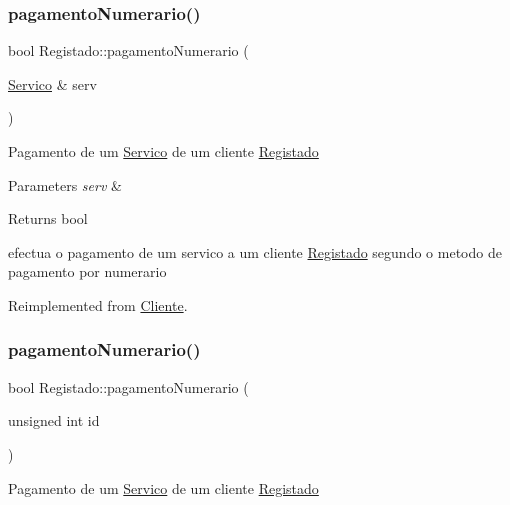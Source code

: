 \subsubsection{\texorpdfstring{pagamento\+Numerario()}{pagamentoNumerario()}\hspace{0.1cm}{\footnotesize\ttfamily [1/2]}}
{\footnotesize\ttfamily bool Registado\+::pagamento\+Numerario (\begin{DoxyParamCaption}\item[{\hyperlink{class_servico}{Servico} \&}]{serv }\end{DoxyParamCaption})\hspace{0.3cm}{\ttfamily [virtual]}}

Pagamento de um \hyperlink{class_servico}{Servico} de um cliente \hyperlink{class_registado}{Registado}


\begin{DoxyParams}{Parameters}
{\em serv} & \\
\hline
\end{DoxyParams}
\begin{DoxyReturn}{Returns}
bool
\end{DoxyReturn}
efectua o pagamento de um servico a um cliente \hyperlink{class_registado}{Registado} segundo o metodo de pagamento por numerario 

Reimplemented from \hyperlink{class_cliente_a68646846a80de5cdcb61b1f8a13e4fb8}{Cliente}.

\mbox{\label{class_registado_a16a6ec63ed53fd4b6ebb1105ae5812d7}} 
\subsubsection{\texorpdfstring{pagamento\+Numerario()}{pagamentoNumerario()}\hspace{0.1cm}{\footnotesize\ttfamily [2/2]}}
{\footnotesize\ttfamily bool Registado\+::pagamento\+Numerario (\begin{DoxyParamCaption}\item[{unsigned int}]{id }\end{DoxyParamCaption})\hspace{0.3cm}{\ttfamily [virtual]}}

Pagamento de um \hyperlink{class_servico}{Servico} de um cliente \hyperlink{class_registado}{Registado}



